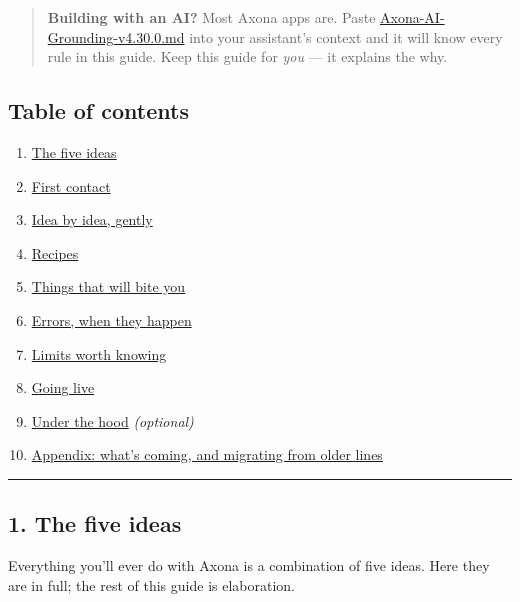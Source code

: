 \documentclass[
  nobib]{tufte-handout}
\providecommand{\tightlist}{%
  \setlength{\itemsep}{0pt}\setlength{\parskip}{0pt}}
\begin{document}
\begin{quote}
\textbf{Building with an AI?} Most Axona apps are. Paste
\url{Axona-AI-Grounding-v4.30.0.md} into your assistant's context and it
will know every rule in this guide. Keep this guide for \emph{you} ---
it explains the why.
\end{quote}

\subsection{Table of contents}\label{table-of-contents}

\begin{enumerate}
\def\labelenumi{\arabic{enumi}.}
\tightlist
\item
  \hyperref[1-the-five-ideas]{The five ideas}
\item
  \hyperref[2-first-contact]{First contact}
\item
  \hyperref[3-idea-by-idea-gently]{Idea by idea, gently}
\item
  \hyperref[4-recipes]{Recipes}
\item
  \hyperref[5-things-that-will-bite-you]{Things that will bite you}
\item
  \hyperref[6-errors-when-they-happen]{Errors, when they happen}
\item
  \hyperref[7-limits-worth-knowing]{Limits worth knowing}
\item
  \hyperref[8-going-live]{Going live}
\item
  \hyperref[9-under-the-hood--optional]{Under the hood}
  \emph{(optional)}
\item
  \hyperref[10-appendix]{Appendix: what's coming, and migrating from
  older lines}
\end{enumerate}

\begin{center}\rule{0.5\linewidth}{0.5pt}\end{center}

\subsection{1. The five ideas}\label{the-five-ideas}

Everything you'll ever do with Axona is a combination of five ideas.
Here they are in full; the rest of this guide is elaboration.
\end{document}

